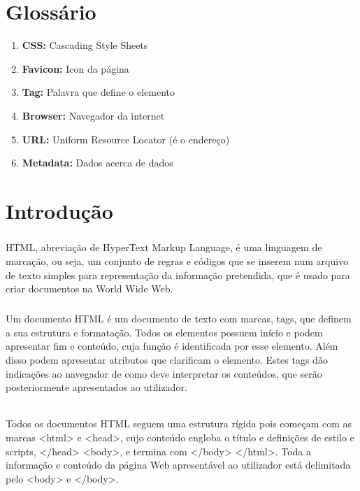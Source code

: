 \documentclass[a4paper,12pt,openright,oneside]{report}
\begin{document}
 
 
\chapter*{Glossário}
\begin{enumerate} 
\renewcommand{\theenumi}{\Roman{enumi}} 
\item \textbf{CSS:} Cascading Style Sheets
\item \textbf{Favicon:} Icon da página
\item \textbf{Tag:} Palavra que define o elemento
\item \textbf{Browser:} Navegador da internet
\item \textbf{URL:} Uniform Resource Locator (é o endereço)
\item \textbf{Metadata:} Dados acerca de dados
\end{enumerate}

\renewcommand{\contentsname}{Índice} 
\tableofcontents
\listoffigures

\chapter*{Introdução}
\paragraph*{}
HTML, abreviação de HyperText Markup Language, é uma linguagem de marcação, ou seja, um conjunto de regras e códigos que se inserem num arquivo de texto simples para representação da informação pretendida, que é usado para criar documentos na World Wide Web.
\paragraph*{}
Um documento HTML é um documento de texto com marcas, tags, que definem a sua estrutura e formatação. Todos os elementos possuem início e podem apresentar fim e conteúdo, cuja função é identificada por esse elemento. Além disso podem apresentar atributos que clarificam o elemento. Estes tags dão indicações ao navegador de como deve interpretar os conteúdos, que serão posteriormente apresentados ao utilizador.\cite{2site}
\subparagraph*{}
Todos os documentos HTML seguem uma estrutura rígida pois começam com as marcas <html> e <head>, cujo conteúdo engloba o título e definições de estilo e scripts, </head> <body>, e termina com </body> </html>. Toda a informação e conteúdo da página Web apresentável ao utilizador está delimitada pelo <body> e </body>.\cite{1site}
\end{document}
